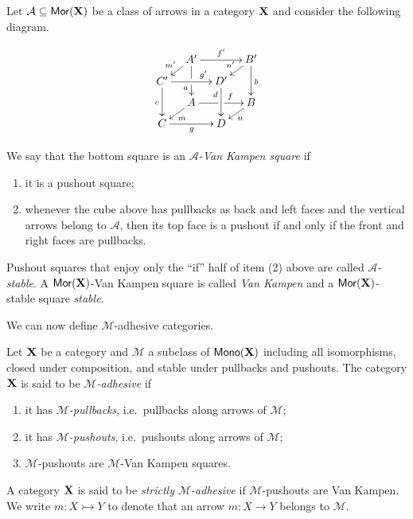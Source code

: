 \documentclass[runningheads,envcountsect]{llncs}
\def\C{\textbf {\textup{C}}}
\def\X{\textbf {\textup{X}}}
\newcommand{\mor}{\mathsf{Mor}}
\newcommand{\mon}{\mathsf{Mono}}
\newcommand{\mto}{\rightarrowtail}
\begin{document}
\begin{definition}
	Let $\mathcal{A}\subseteq \mor(\X)$ be a class of arrows in a category $\X$ and consider the following diagram.
	
		\[
	\xymatrix@C=10pt@R=6pt{&A'\ar[dd]|\hole_(.65){a}\ar[rr]^{f'} \ar[dl]_{m'} && B' \ar[dd]^{b} \ar[dl]_{n'} \\ C'  \ar[dd]_{c}\ar[rr]^(.7){g'} & & D' \ar[dd]_(.3){d}\\&A\ar[rr]|\hole^(.65){f} \ar[dl]^{m} && B \ar[dl]^{n} \\C \ar[rr]_{g} & & D }\]
	
	We say that the bottom square is an \emph{$\mathcal{A}$-Van Kampen square} if
		\begin{enumerate}
			\item it is a pushout square;
			\item 	whenever the cube above has pullbacks as back and left faces and the vertical arrows belong to $\mathcal{A}$, then its top face is a pushout 
			if and only if the front and right faces are pullbacks.
	\end{enumerate}


	Pushout squares that enjoy only the ``if'' half of item (2) above are called \emph{$\mathcal{A}$-stable}. A $\mor(\X)$-Van Kampen square is called  \emph{Van
		Kampen} and a $\mor(\X)$-stable square  \emph{stable}.
\end{definition}

We can now define $\mathcal{M}$-adhesive categories.

\begin{definition}
	Let $\X$ be a category and $\mathcal{M}$ a subclass of
	$\mon(\X)$  including  all isomorphisms, closed under composition,  and stable under pullbacks and pushouts.  The category  $\X$ is said to be \emph{$\mathcal{M}$-adhesive} if
	\begin{enumerate}
		\item it has \emph{$\mathcal{M}$-pullbacks}, i.e.~pullbacks along arrows of $\mathcal{M}$;
		\item it has \emph{$\mathcal{M}$-pushouts}, i.e.~pushouts along arrows of $\mathcal{M}$;
		\item  $\mathcal{M}$-pushouts are $\mathcal{M}$-Van Kampen squares.
	\end{enumerate}
	
	A category $\X$ is said to be \emph{strictly $\mathcal{M}$-adhesive}
	if $\mathcal{M}$-pushouts are Van Kampen. We write $m\colon X \mto Y$ to denote that an arrow $m\colon X\to Y$ belongs to $\mathcal{M}$.
\end{definition}
\end{document}
